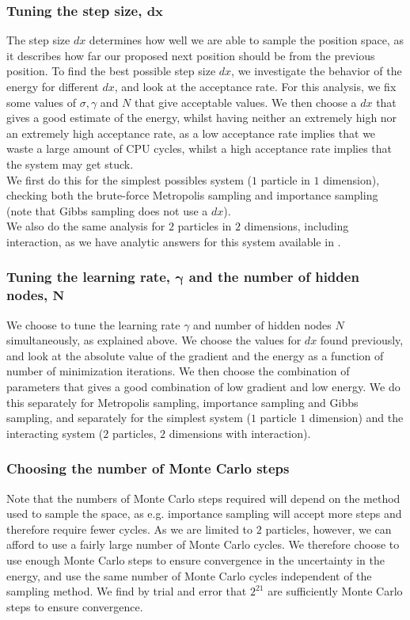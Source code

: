 \documentclass[a4paper, 10pt]{article}
\begin{document}
	\subsubsection{Tuning the step size, $\boldsymbol{dx}$}
	The step size $dx$ determines how well we are able to sample the position space, as it describes how far our proposed next position should be from the previous position. To find the best possible step size $dx$, we investigate the behavior of the energy for different $dx$, and look at the acceptance rate. For this analysis, we fix some values of $\sigma,\gamma$ and $N$ that give acceptable values. We then choose a $dx$ that gives a good estimate of the energy, whilst having neither an extremely high nor an extremely high acceptance rate, as a low acceptance rate implies that we waste a large amount of CPU cycles, whilst a high acceptance rate implies that the system may get stuck.\\
	\linebreak
	We first do this for the simplest possibles system ($1$ particle in $1$ dimension), checking both the brute-force Metropolis sampling and importance sampling (note that Gibbs sampling does not use a $dx$).\\
	\linebreak
	We also do the same analysis for $2$ particles in $2$ dimensions, including interaction, as we have analytic answers for this system available in \cite{0305-4470-27-3-040}.
	\subsubsection{Tuning the learning rate, $\boldsymbol{\gamma}$ and the number of hidden nodes, $\boldsymbol{N}$}\label{sec:Met_tuning_gamma_N}
	We choose to tune the learning rate $\gamma$ and number of hidden nodes $N$ simultaneously, as explained above. We choose the values for $dx$ found previously, and look at the absolute value of the gradient and the energy as a function of number of minimization iterations. We then choose the combination of parameters that gives a good combination of low gradient and low energy. We do this separately for Metropolis sampling, importance sampling and Gibbs sampling, and separately for the simplest system ($1$ particle $1$ dimension) and the interacting system ($2$ particles, $2$ dimensions with interaction).
	\subsubsection{Choosing the number of Monte Carlo steps}
	Note that the numbers of Monte Carlo steps required will depend on the method used to sample the space, as e.g. importance sampling will accept more steps and therefore require fewer cycles. As we are limited to $2$ particles, however, we can afford to use a fairly large number of Monte Carlo cycles. We therefore choose to use enough Monte Carlo steps to ensure convergence in the uncertainty in the energy, and use the same number of Monte Carlo cycles independent of the sampling method. We find by trial and error that $2^{21}$ are sufficiently Monte Carlo steps to ensure convergence.
\end{document}
